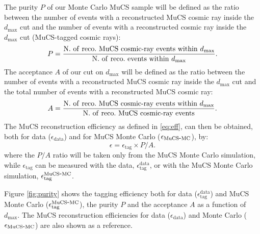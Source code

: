 \documentclass[a4paper]{scrartcl}
\def\myhyphen{{\hbox{-}}}
\begin{document}
The purity $P$ of our Monte Carlo MuCS sample will be defined as the ratio between the number of events with a reconstructed MuCS cosmic ray inside the $d_{\mathrm{max}}$ cut and the number of events with a reconstructed cosmic ray inside the $d_{\mathrm{max}}$ cut (MuCS-tagged cosmic rays):
\begin{equation}
  P=\frac{\mathrm{N.~of~reco.~MuCS~cosmic\myhyphen ray~events~within~}d_{\mathrm{max}}}{\mathrm{N.~of~reco.~events~within~}d_{\mathrm{max}}}.
\end{equation}
The acceptance $A$ of our cut on $d_{\mathrm{max}}$ will be defined as the ratio between the number of events with a reconstructed MuCS cosmic ray inside the $d_{\mathrm{max}}$ cut and the total number of events with a reconstructed MuCS cosmic ray:
\begin{equation}
  A=\frac{\mathrm{N.~of~reco.~MuCS~cosmic\myhyphen ray~events~within~}d_{\mathrm{max}}}{\mathrm{N.~of~reco.~MuCS~cosmic\myhyphen ray~events}}.
\end{equation}
The MuCS reconstruction efficiency as defined in \eqref{eq:eff}, can then be obtained, both for data ($\epsilon_{\mathrm{data}}$) and for MuCS Monte Carlo ($\epsilon_{\mathrm{MuCS\myhyphen MC}}$), by:
\begin{equation}\label{eq:mceff}
  \epsilon = \epsilon_{\mathrm{tag}} \times P / A.
\end{equation}
where the $P/A$ ratio will be taken only from the MuCS Monte Carlo simulation, while $\epsilon_{\mathrm{tag}}$ can be measured with the data, $\epsilon^{\mathrm{data}}_{\mathrm{tag}}$, or with the MuCS Monte Carlo simulation, $\epsilon^{\mathrm{MuCS\myhyphen MC}}_{\mathrm{tag}}$.

Figure \ref{fig:purity} shows the tagging efficiency both for data ($\epsilon^{\mathrm{data}}_{\mathrm{tag}}$) and MuCS Monte Carlo  ($\epsilon^{\mathrm{MuCS\myhyphen MC}}_{\mathrm{tag}}$), the purity $P$ and the acceptance $A$ as a function of $d_{\mathrm{max}}$. The MuCS reconstruction efficiencies for data ($\epsilon_{\mathrm{data}}$) and Monte Carlo ($\epsilon_{\mathrm{MuCS\myhyphen MC}}$) are also shown as a reference.
\end{document}
